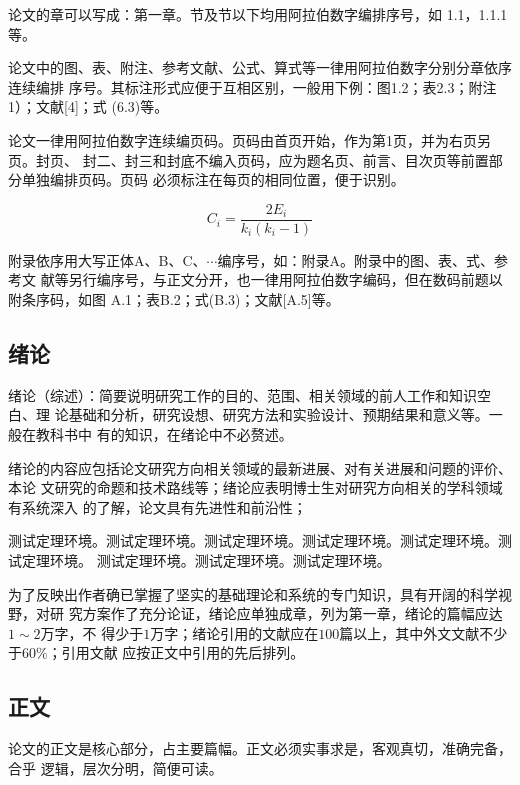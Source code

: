 \documentclass[master]{njuthesis}
\begin{document}
论文的章可以写成：第一章。节及节以下均用阿拉伯数字编排序号，如
1.1，1.1.1等。

论文中的图、表、附注、参考文献、公式、算式等一律用阿拉伯数字分别分章依序连续编排
序号。其标注形式应便于互相区别，一般用下例：图1.2；表2.3；附注1）；文献[4]；式
  (6.3)等。

论文一律用阿拉伯数字连续编页码。页码由首页开始，作为第1页，并为右页另页。封页、
封二、封三和封底不编入页码，应为题名页、前言、目次页等前置部分单独编排页码。页码
必须标注在每页的相同位置，便于识别。

\begin{equation}
    C_i = \frac{2E_i}{k_i(k_i-1)}
\end{equation}

附录依序用大写正体A、B、C、$\cdots$编序号，如：附录A。附录中的图、表、式、参考文
献等另行编序号，与正文分开，也一律用阿拉伯数字编码，但在数码前题以附条序码，如图
A.1；表B.2；式(B.3)；文献[A.5]等。

\subsection{绪论}

绪论（综述）：简要说明研究工作的目的、范围、相关领域的前人工作和知识空白、理
论基础和分析，研究设想、研究方法和实验设计、预期结果和意义等。一般在教科书中
有的知识，在绪论中不必赘述。

绪论的内容应包括论文研究方向相关领域的最新进展、对有关进展和问题的评价、本论
文研究的命题和技术路线等；绪论应表明博士生对研究方向相关的学科领域有系统深入
的了解，论文具有先进性和前沿性；

\begin{problem}
测试定理环境。测试定理环境。测试定理环境。测试定理环境。测试定理环境。测试定理环境。
测试定理环境。测试定理环境。测试定理环境。
\end{problem}

为了反映出作者确已掌握了坚实的基础理论和系统的专门知识，具有开阔的科学视野，对研
究方案作了充分论证，绪论应单独成章，列为第一章，绪论的篇幅应达$1\sim 2$万字，不
得少于$1$万字；绪论引用的文献应在$100$篇以上，其中外文文献不少于$60\%$；引用文献
应按正文中引用的先后排列。

\subsection{正文}

论文的正文是核心部分，占主要篇幅。正文必须实事求是，客观真切，准确完备，合乎
逻辑，层次分明，简便可读。
\end{document}
